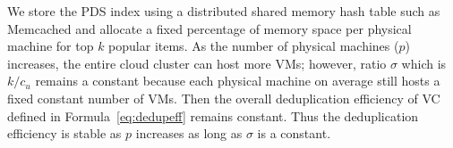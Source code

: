 {%

We store the PDS index using a distributed shared memory hash table such as Memcached
and allocate a fixed percentage of memory space per physical machine for top $k$ popular items.
As the number of physical machines ($p$) increases,
the entire cloud cluster can host more VMs; however,  ratio $\sigma$ which is $k/c_u$ remains
a constant because each physical machine on average still hosts a fixed constant number of 
VMs. Then the overall deduplication efficiency of VC defined in Formula~\ref{eq:dedupeff}
remains constant.
Thus the deduplication efficiency is stable  as $p$ increases as long as $\sigma$  is a constant.


\begin{figure}[htbp]
\vspace{2em}


\end{figure}}

